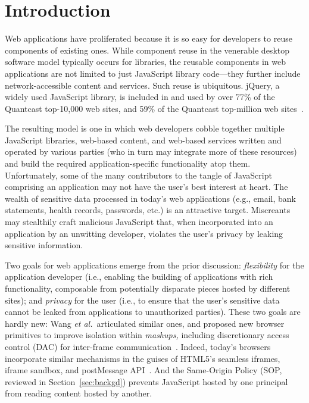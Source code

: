 \section{Introduction}
\label{sec:intro}

Web applications have proliferated because it is so easy for
developers to reuse components of existing ones. While component reuse
in the venerable desktop software model typically occurs for libraries,
the reusable components in web applications are not limited to just
JavaScript library code---they further include network-accessible
content and services. Such reuse is ubiquitous. jQuery, a widely used
JavaScript library, is included in and used by over 77\% of the
Quantcast top-10,000 web sites, and 59\% of the Quantcast top-million
web sites~\cite{quantcast}.

The resulting model is one in which web developers cobble together
multiple JavaScript libraries, web-based content, and web-based
services written and operated by various parties (who in turn may
integrate more of these resources) and build the required
application-specific functionality atop them. Unfortunately, some of
the many contributors to the tangle of JavaScript comprising an
application may not have the user's best interest at heart. The wealth
of sensitive data processed in today's web applications (e.g., email,
bank statements, health records, passwords, etc.) is an attractive
target. Miscreants may stealthily craft malicious JavaScript that,
when incorporated into an application by an unwitting developer,
violates the user's privacy by leaking sensitive information.

Two goals for web applications emerge from the prior discussion:
{\em flexibility} for the application developer (i.e., enabling the
building of applications with rich functionality, composable from
potentially disparate pieces hosted by different sites); and {\em
  privacy} for the user (i.e., to ensure that the user's sensitive
data cannot be leaked from applications to unauthorized parties).
These two goals are hardly new: Wang {\em et al.}~articulated similar
ones, and proposed new browser primitives to improve isolation within
{\em mashups,} including discretionary access control (DAC) for inter-frame
communication~\cite{mashupos}. Indeed, today's browsers incorporate
similar mechanisms in the guises of HTML5's seamless iframes, iframe
sandbox, and postMessage API~\cite{html5}. And the Same-Origin Policy
(SOP, reviewed in Section~\ref{sec:backgd}) prevents JavaScript hosted
by one principal from reading content hosted by another.

